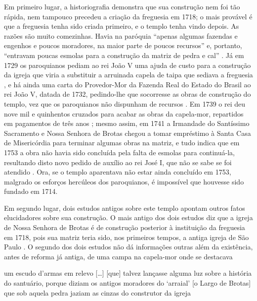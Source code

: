 Em primeiro lugar, a historiografia demonstra que sua construção nem foi tão rápida, nem tampouco precedeu a criação da freguesia em 1718; o mais provável é que a freguesia tenha sido criada primeiro, e o templo tenha vindo depois. As razões são muito comezinhas. Havia na paróquia ``apenas algumas fazendas e engenhos e poucos moradores, na maior parte de poucos recursos'' e, portanto, ``entravam poucas esmolas para a construção da matriz de pedra e cal'' \cite[p.~10]{ott_engenhos_1996}. Já em 1729 os paroquianos pediam ao rei João V uma ajuda de custo para a construção da igreja que viria a substituir a arruinada capela de taipa que sediava a freguesia \cite[p.~10]{ott_engenhos_1996}, e há ainda uma carta do Provedor-Mor da Fazenda Real do Estado do Brasil ao rei João V, datada de 1732, pedindo-lhe que socorresse as obras de construção do templo, vez que os paroquianos não dispunham de recursos \cite[p.~30]{vivas_botelho_2011}. Em 1739 o rei deu nove mil e quinhentos cruzados para acabar as obras da capela-mor, repartidos em pagamentos de três anos \cite[p.~10]{ott_engenhos_1996}; mesmo assim, em 1741 a Irmandade do Santíssimo Sacramento e Nossa Senhora de Brotas chegou a tomar empréstimo à Santa Casa de Misericórdia para terminar algumas obras na matriz, e tudo indica que em 1753 a obra não havia sido concluída pela falta de esmolas para continuá-la, resultando disto novo pedido de auxílio ao rei José I, que não se sabe se foi atendido \cite[p.~10]{ott_engenhos_1996}. Ora, se o templo aparentava não estar ainda concluído em 1753, malgrado os esforços hercúleos dos paroquianos, é impossível que houvesse sido fundado em 1714. 

Em segundo lugar, dois estudos antigos sobre este templo \cite{campos_brotas_1942,texbar_capellas_1930} apontam outros fatos elucidadores sobre sua construção. O mais antigo dos dois estudos diz que a igreja de Nossa Senhora de Brotas é de construção posterior à instituição da freguesia em 1718, pois sua matriz teria sido, nos primeiros tempos, a antiga igreja de São Paulo \cite[p.~344]{texbar_capellas_1930}. O segundo dos dois estudos não dá informações outras além da existência, antes de reforma já antiga, de uma campa na capela-mor onde se destacava 

\begin{citacao}
um escudo d'armas em relevo [\dots] [que] talvez lançasse alguma luz sobre a história do santuário, porque diziam os antigos moradores do `arraial' [o Largo de Brotas] que sob aquela pedra jaziam as cinzas do construtor da igreja \cite[p.~88]{campos_brotas_1942}
\end{citacao}

